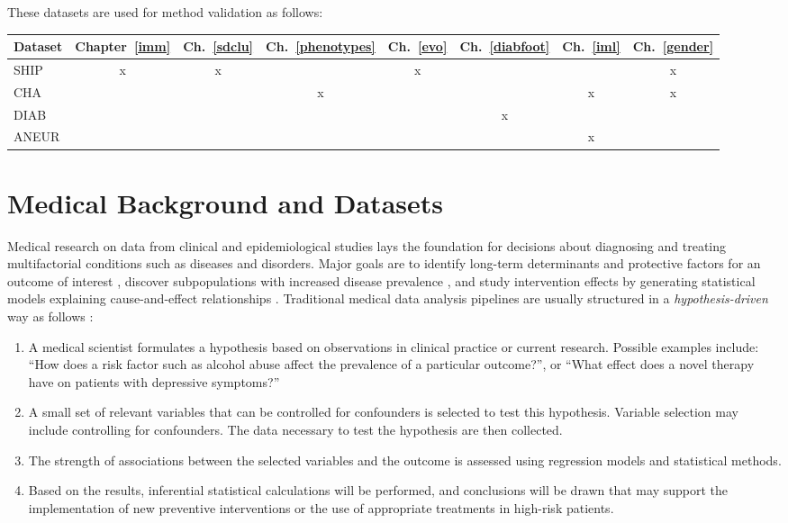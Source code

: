 \documentclass[
  oneside]{book}
\providecommand{\tightlist}{%
  \setlength{\itemsep}{0pt}\setlength{\parskip}{0pt}}
\begin{document}
These datasets are used for method validation as follows:

\begin{table}[H]
\centering
\begin{tabular}[t]{lccccccc}
\toprule
Dataset & Chapter~\ref{imm} & Ch.~\ref{sdclu} & Ch.~\ref{phenotypes} & Ch.~\ref{evo} & Ch.~\ref{diabfoot} & Ch.~\ref{iml} & Ch.~\ref{gender}\\
\midrule
SHIP & x & x &  & x &  &  & x\\
CHA &  &  & x &  &  & x & x\\
DIAB &  &  &  &  & x &  & \\
ANEUR &  &  &  &  &  & x & \\
\bottomrule
\end{tabular}
\end{table}

\hypertarget{background}{%
\chapter{Medical Background and Datasets}\label{background}}

Medical research on data from clinical and epidemiological studies lays the foundation for decisions about diagnosing and treating multifactorial conditions such as diseases and disorders.
Major goals are to identify long-term determinants and protective factors for an outcome of interest \autocite{guo2020diabetes,boehme2017stroke,oliver2020causes}, discover subpopulations with increased disease prevalence \autocite{sanchez2020interpreting,cimini2021adipose,cohen2020clinical}, and study intervention effects by generating statistical models explaining cause-and-effect relationships \autocite{tsiatis2019dynamic,hong2019quantile,guglielmi2019statistical}.
Traditional medical data analysis pipelines are usually structured in a \emph{hypothesis-driven} way as follows \autocite{Klemm14}:

\begin{enumerate}
\def\labelenumi{(\arabic{enumi})}
\tightlist
\item
  A medical scientist formulates a hypothesis based on observations in clinical practice or current research. Possible examples include: ``How does a risk factor such as alcohol abuse affect the prevalence of a particular outcome?'', or ``What effect does a novel therapy have on patients with depressive symptoms?''
\item
  A small set of relevant variables that can be controlled for confounders is selected to test this hypothesis. Variable selection may include controlling for confounders. The data necessary to test the hypothesis are then collected.
\item
  The strength of associations between the selected variables and the outcome is assessed using regression models and statistical methods.
\item
  Based on the results, inferential statistical calculations will be performed, and conclusions will be drawn that may support the implementation of new preventive interventions or the use of appropriate treatments in high-risk patients.
\end{enumerate}
\end{document}
